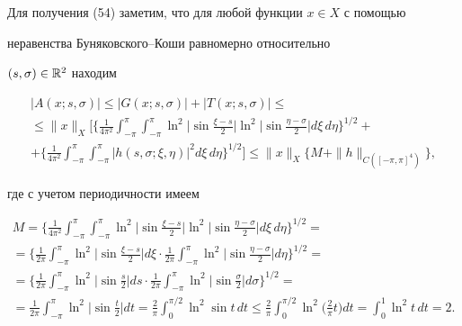  


Для получения (54) заметим, что для любой функции $x\in X$ с помощью 


неравенства Буняковского--Коши равномерно относительно 


$(s,\sigma)\in\Bbb R^2$ находим 


\begin{multline} 


|A(x;s,\sigma)|\le|G(x;s,\sigma)|+|T(x;s,\sigma)|\le \\ 


% 


\le\|x\|_X\bigg[\bigg\{\frac{1}{4\pi^2} 


\int^\pi_{-\pi}\int^\pi_{-\pi} 


\ln^2\bigg|\sin\frac{\xi-s}{2}\bigg|\ln^2


\bigg|\sin\frac{\eta-\sigma}{2}\bigg|d\xi\,d\eta\bigg\}^{1/2} + \\ 


% 


+\bigg\{\frac{1}{4\pi^2}\int^\pi_{-\pi}\int^\pi_{-\pi} 


|h(s,\sigma;\xi,\eta)|^2d\xi\,d\eta\bigg\}^{1/2}\bigg]\le 


\|x\|_X\{M+\|h\|_{C([-\pi,\pi]^4)}\}, 


\end{multline} 


где с учетом периодичности имеем 


\begin{multline} 


M=\bigg\{\frac{1}{4\pi^2}\int^\pi_{-\pi}\int^\pi_{-\pi} 


\ln^2\bigg|\sin\frac{\xi-s}{2}\bigg|\ln^2


\bigg|\sin\frac{\eta-\sigma}{2}\bigg|d\xi\,d\eta\bigg\}^{1/2}= \\ 


% 


=\bigg\{\frac{1}{2\pi}\int^\pi_{-\pi} 


\ln^2\bigg|\sin\frac{\xi-s}{2}\bigg|d\xi\cdot\frac{1}{2\pi} 


\int^\pi_{-\pi}\ln^2


\bigg|\sin\frac{\eta-\sigma}{2}\bigg|d\eta\bigg\}^{1/2}= \\ 


% 


=\bigg\{\frac{1}{2\pi}\int^\pi_{-\pi} 


\ln^2\bigg|\sin\frac{s}{2}\bigg|ds\cdot\frac{1}{2\pi} 


\int^\pi_{-\pi}\ln^2


\bigg|\sin\frac{\sigma}{2}\bigg|d\sigma\bigg\}^{1/2}= \\ 


% 


=\frac{1}{2\pi}\int^\pi_{-\pi}\ln^2\bigg|\sin\frac{t}{2}\bigg|dt= 


\frac{2}{\pi}\int^{\pi/2}_0\ln^2\sin t\,dt\le\frac{2}{\pi} 


\int^{\pi/2}_0\ln^2\bigg(\frac{2}{\pi}t\bigg)dt= 


\int^1_0 \ln^2t\,dt=2. 


\end{multline} 


